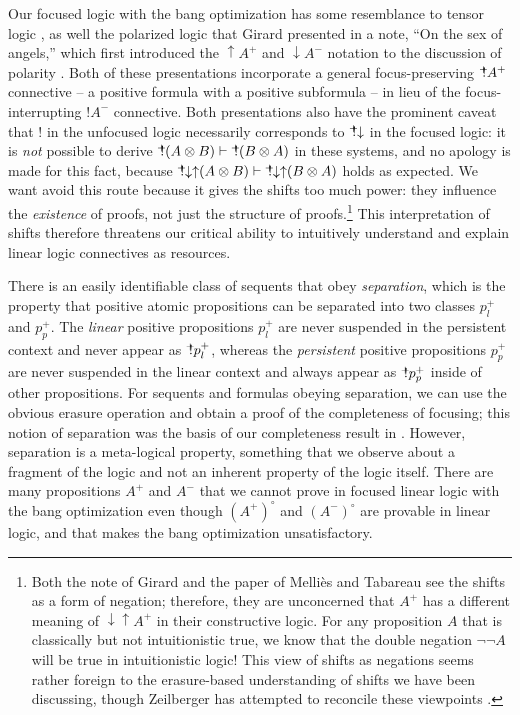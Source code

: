 Our focused logic with the bang optimization has some resemblance to
tensor logic \cite{mellies10resource}, as well the polarized logic
that Girard presented in a note, ``On the sex of angels,'' which first
introduced the ${\uparrow}A^+$ and ${\downarrow}A^-$ notation to the
discussion of polarity \cite{girard91sex}. Both of these presentations
incorporate a general focus-preserving ${\mbox{\hspace{2pt}$\mathbb !$\hspace{-5pt}$^+$\hspace{-1pt}}}A^+$ connective -- a
positive formula with a positive subformula -- in lieu of the
focus-interrupting ${!}A^-$ connective.  Both presentations also have
the prominent caveat that ${!}$ in the unfocused logic necessarily
corresponds to ${\mbox{\hspace{2pt}$\mathbb !$\hspace{-5pt}$^+$\hspace{-1pt}}}{\downarrow}$ in the focused logic: it is {\it
  not} possible to derive ${\mbox{\hspace{2pt}$\mathbb !$\hspace{-5pt}$^+$\hspace{-1pt}}}(A \otimes B) \vdash {\mbox{\hspace{2pt}$\mathbb !$\hspace{-5pt}$^+$\hspace{-1pt}}}(B
\otimes A)$ in these systems, and no apology is made for this fact,
because ${\mbox{\hspace{2pt}$\mathbb !$\hspace{-5pt}$^+$\hspace{-1pt}}}{\downarrow}{\uparrow}(A \otimes B) \vdash
{\mbox{\hspace{2pt}$\mathbb !$\hspace{-5pt}$^+$\hspace{-1pt}}}{\downarrow}{\uparrow}(B \otimes A)$ holds as expected.  We
want avoid this route because it gives the shifts too much power: they
influence the {\it existence} of proofs, not just the structure of
proofs.\footnote{Both the note of Girard and the paper of Melli{\`e}s
  and Tabareau see the shifts as a form of negation; therefore, they
  are unconcerned that $A^+$ has a different meaning of
  ${\downarrow}{\uparrow}A^+$ in their constructive logic. For any
  proposition $A$ that is classically but not intuitionistic true, we
  know that the double negation $\neg\neg A$ will be true in
  intuitionistic logic! This view of shifts as negations seems rather
  foreign to the erasure-based understanding of shifts we have been
  discussing, though Zeilberger has attempted to reconcile these
  viewpoints \cite{zeilberger08unity}.} This interpretation of shifts
therefore threatens our critical ability to intuitively understand and
explain linear logic connectives as resources.

There is an easily identifiable class of sequents that obey {\it
  separation}, which is the property that positive atomic propositions
can be separated into two classes $p^+_l$ and $p^+_p$. The {\it
  linear} positive propositions $p^+_l$ are never suspended in the
persistent context and never appear as ${\mbox{\hspace{2pt}$\mathbb !$\hspace{-5pt}$^+$\hspace{-1pt}}}p^+_l$, whereas the
{\it persistent} positive propositions $p^+_p$ are never suspended in
the linear context and always appear as ${\mbox{\hspace{2pt}$\mathbb !$\hspace{-5pt}$^+$\hspace{-1pt}}}p^+_p$ inside of
other propositions. For sequents and formulas obeying separation, we
can use the obvious erasure operation and obtain a proof of the
completeness of focusing; this notion of separation was the basis of
our completeness result in \cite{pfenning09substructural}.  However,
separation is a meta-logical property, something that we observe about
a fragment of the logic and not an inherent property of the logic
itself. There are many propositions $A^+$ and $A^-$ that we cannot
prove in focused linear logic with the bang optimization even though
$(A^+)^\circ$ and $(A^-)^\circ$ are provable in linear logic, and that
makes the bang optimization unsatisfactory.

